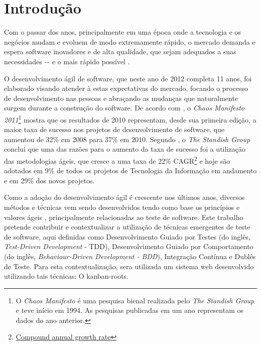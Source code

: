 \chapter{Introdução}

Com o passar dos anos, principalmente em uma época onde a tecnologia e os negócios mudam e evoluem de modo extremamente rápido, o mercado demanda e espera software inovadores e de alta qualidade, que sejam adequados a suas necessidades $-$ e o mais rápido possível \cite{TheBusinessOfInnovation}.

O desenvolvimento ágil de software, que neste ano de 2012 completa 11 anos, foi elaborado \cite{AgileManifesto} visando atender à estas expectativas do mercado, focando o processo de desenvolvimento nas pessoas e abraçando as mudanças que  naturalmente surgem durante a construção do software. De acordo com , o \textit{Chaos Manifesto 2011}\footnote{O \textit{Chaos Manifesto} é uma pesquisa bienal realizada pelo \textit{The Standish Group} e teve início em 1994. As pesquisas publicadas em um ano representam os dados do ano anterior.} mostra que os resultados de 2010 representam, desde sua primeira edição, a maior taxa de sucesso nos projetos de desenvolvimento de software, que aumentou de 32\% em 2008 para 37\% em 2010. Segundo , o \textit{The Standish Group} conclui que uma das razões para o aumento da taxa de sucesso foi a utilização das metodologias ágeis, que cresce a uma taxa de 22\% CAGR\footnote{\href{http://en.wikipedia.org/wiki/Compound_annual_growth_rate} {Compound annual growth rate}} e hoje são adotados em 9\% de todos os projetos de Tecnologia da Informação em andamento e em 29\% dos novos projetos.

Como a adoção do desenvolvimento ágil é crescente nos últimos anos, diversos métodos e técnicas vem sendo desenvolvidos tendo como base os princípios e valores ágeis \cite{BDDRodrigo}, principalmente relacionadas ao teste de software. Este trabalho pretende contribuir e contextualizar a utilização de técnicas emergentes de teste de software, aqui definidas como Desenvolvimento Guiado por Testes (do inglês, \textit{Test-Driven Development} - TDD), Desenvolvimento Guiado por Comportamento (do inglês, \textit{Behaviour-Driven Development - BDD}), Integração Contínua e Dublês de Teste. Para esta contextualização, sera utilizada um sistema web desenvolvido utilizando tais técnicas: O kanban-roots.

